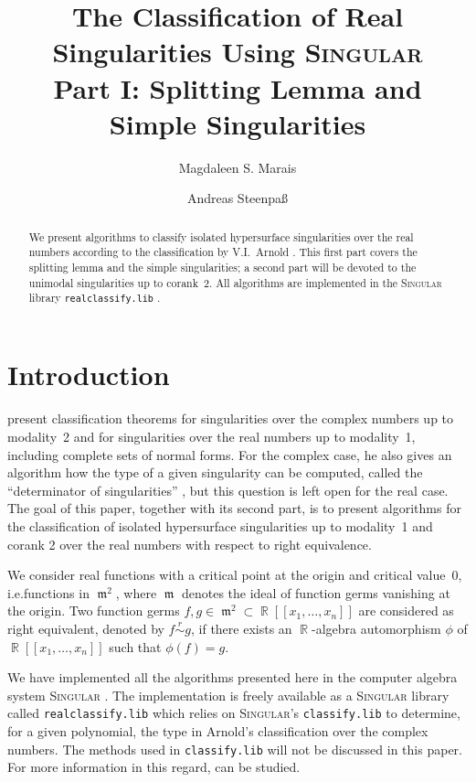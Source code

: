 \documentclass[noend]{amsproc}
\title[The Classification of Real Singularities Using \textsc{Singular}, %
Part I]%
{The Classification of Real Singularities Using \textsc{Singular}\\
Part I: Splitting Lemma and Simple Singularities}
\author{Magdaleen S. Marais}
\author{Andreas Steenpa\ss}
\theoremstyle{definition}
\newcommand{\Singular}{\textsc{Singular}}
\newcommand{\realclassify}{\texttt{realclassify.lib}}
\newcommand{\classify}{\texttt{classify.lib}}
\newcommand{\requiv}{\ensuremath{\mathrel{\overset{r}{\sim}}}}
\DeclareMathOperator{\m}{\mathfrak{m}}
\DeclareMathOperator{\R}{\mathbb{R}}
\begin{document}
\begin{abstract}
We present algorithms to classify isolated hypersurface singularities over the
real numbers according to the classification by V.I.~Arnold \citep{AVG1985}.
This first part covers the splitting lemma and the simple singularities; a
second part will be devoted to the unimodal singularities up to corank~2.
All algorithms are implemented in the \Singular{} library \realclassify{}
\citep{realclassify}.
\end{abstract}

\maketitle


\section{Introduction}
\citet{AVG1985} present classification theorems for
singularities over the complex numbers up to modality~2 and for singularities
over the real numbers up to modality~1, including complete sets of normal
forms. For the complex case, he also gives an algorithm how the type of a given
singularity can be computed, called the ``determinator of singularities''
\citep[cf.\@][ch.~16]{AVG1985}, but this question is left open for the real
case.
The goal of this paper, together with its second part, is to present algorithms
for the classification of isolated hypersurface singularities up to modality~1
and corank 2 over the real numbers with respect to right equivalence.

We consider real functions with a critical point at the origin and critical
value~$0$, i.e.\@ functions in $\m^2$, where $\m$ denotes the ideal of function
germs vanishing at the origin. Two function germs $f, g \in \m^2 \subset
\R[[x_1,\ldots,x_n]]$ are considered as right equivalent, denoted by
$f \requiv g$, if there exists an $\R$-algebra automorphism $\phi$ of
$\R[[x_1,\ldots,x_n]]$ such that $\phi(f) = g$.

We have implemented all the algorithms presented here in the computer algebra
system \Singular{} \citep{DGPS}. The implementation is freely available as a
\Singular{} library called \realclassify{} which relies on \Singular's
\classify{} to determine, for a given polynomial, the type in Arnold's
classification over the complex numbers. The methods used in \classify{} will
not be discussed in this paper. For more information in this regard,
\citet{Kruger} can be studied.
\end{document}
